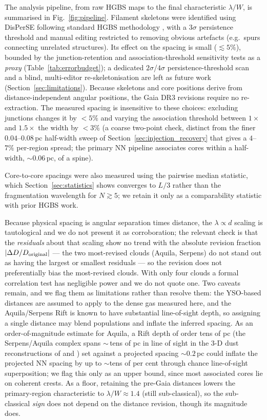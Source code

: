 \documentclass[usenatbib,twoside,twocolumn]{mnras}
\begin{document}
The analysis pipeline, from raw HGBS maps to the final characteristic $\lambda/W$, is summarised in Fig.~\ref{fig:pipeline}. Filament skeletons were identified using DisPerSE \citep{Sousbie2011} following standard HGBS methodology \citep{Arzoumanian2011}, with a $3\sigma$ persistence threshold and manual editing restricted to removing obvious artefacts (e.g.\ spurs connecting unrelated structures). Its effect on the spacing is small ($\lesssim5\%$), bounded by the junction-retention and association-threshold sensitivity tests as a \emph{proxy} (Table~\ref{tab:errorbudget}); a dedicated $2\sigma$/$4\sigma$ persistence-threshold scan and a blind, multi-editor re-skeletonisation are left as future work (Section~\ref{sec:limitations}). Because skeletons and core positions derive from distance-independent angular positions, the Gaia DR3 revisions require no re-extraction. The measured spacing is insensitive to these choices: excluding junctions changes it by $<5\%$ and varying the association threshold between $1\times$ and $1.5\times$ the width by $<3\%$ (a coarse two-point check, distinct from the finer $0.04$--$0.08$\,pc half-width sweep of Section~\ref{sec:injection_recovery} that gives a $4$--$7\%$ per-region spread; the primary NN pipeline associates cores within a half-width, $\sim0.06$\,pc, of a spine).

Core-to-core spacings were also measured using the pairwise median statistic, which Section~\ref{sec:statistics} shows converges to $L/3$ rather than the fragmentation wavelength for $N\gtrsim5$; we retain it only as a comparability statistic with prior HGBS work.

Because physical spacing is angular separation times distance, the $\lambda\propto d$ scaling is tautological and we do not present it as corroboration; the relevant check is that the \emph{residuals} about that scaling show no trend with the absolute revision fraction $|\Delta D/D_{\rm original}|$ --- the two most-revised clouds (Aquila, Serpens) do not stand out as having the largest or smallest residuals --- so the revision does not preferentially bias the most-revised clouds. With only four clouds a formal correlation test has negligible power and we do not quote one. Two caveats remain, and we flag them as limitations rather than resolve them: the YSO-based distances \citep{Zhang2023} are assumed to apply to the dense gas measured here, and the Aquila/Serpens Rift is known to have substantial line-of-sight depth, so assigning a single distance may blend populations and inflate the inferred spacing. As an order-of-magnitude estimate for Aquila, a Rift depth of order tens of pc (the Serpens/Aquila complex spans $\sim$\,tens of pc in line of sight in the 3-D dust reconstructions of \citealt{Zucker2020} and \citealt{Green2024}) set against a projected spacing $\sim0.2$\,pc could inflate the projected NN spacing by up to $\sim$tens of per cent through chance line-of-sight superposition; we flag this only as an upper bound, since most associated cores lie on coherent crests. As a floor, retaining the pre-Gaia distances lowers the primary-region characteristic to $\lambda/W\approx1.4$ (still sub-classical), so the sub-classical \emph{sign} does not depend on the distance revision, though its magnitude does.
\end{document}

